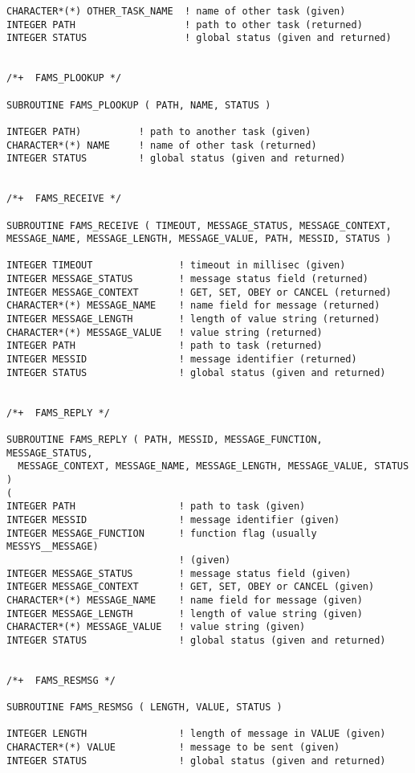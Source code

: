 \begin{verbatim}
CHARACTER*(*) OTHER_TASK_NAME  ! name of other task (given)
INTEGER PATH                   ! path to other task (returned)
INTEGER STATUS                 ! global status (given and returned)


/*+  FAMS_PLOOKUP */

SUBROUTINE FAMS_PLOOKUP ( PATH, NAME, STATUS )

INTEGER PATH)          ! path to another task (given)
CHARACTER*(*) NAME     ! name of other task (returned)
INTEGER STATUS         ! global status (given and returned)


/*+  FAMS_RECEIVE */

SUBROUTINE FAMS_RECEIVE ( TIMEOUT, MESSAGE_STATUS, MESSAGE_CONTEXT,
MESSAGE_NAME, MESSAGE_LENGTH, MESSAGE_VALUE, PATH, MESSID, STATUS )

INTEGER TIMEOUT               ! timeout in millisec (given)
INTEGER MESSAGE_STATUS        ! message status field (returned)
INTEGER MESSAGE_CONTEXT       ! GET, SET, OBEY or CANCEL (returned)
CHARACTER*(*) MESSAGE_NAME    ! name field for message (returned)
INTEGER MESSAGE_LENGTH        ! length of value string (returned)
CHARACTER*(*) MESSAGE_VALUE   ! value string (returned)
INTEGER PATH                  ! path to task (returned)
INTEGER MESSID                ! message identifier (returned)
INTEGER STATUS                ! global status (given and returned)


/*+  FAMS_REPLY */

SUBROUTINE FAMS_REPLY ( PATH, MESSID, MESSAGE_FUNCTION, MESSAGE_STATUS,
  MESSAGE_CONTEXT, MESSAGE_NAME, MESSAGE_LENGTH, MESSAGE_VALUE, STATUS )
(
INTEGER PATH                  ! path to task (given)
INTEGER MESSID                ! message identifier (given)
INTEGER MESSAGE_FUNCTION      ! function flag (usually MESSYS__MESSAGE)
                              ! (given)
INTEGER MESSAGE_STATUS        ! message status field (given)
INTEGER MESSAGE_CONTEXT       ! GET, SET, OBEY or CANCEL (given)
CHARACTER*(*) MESSAGE_NAME    ! name field for message (given)
INTEGER MESSAGE_LENGTH        ! length of value string (given)
CHARACTER*(*) MESSAGE_VALUE   ! value string (given)
INTEGER STATUS                ! global status (given and returned)


/*+  FAMS_RESMSG */

SUBROUTINE FAMS_RESMSG ( LENGTH, VALUE, STATUS )

INTEGER LENGTH                ! length of message in VALUE (given)
CHARACTER*(*) VALUE           ! message to be sent (given)
INTEGER STATUS                ! global status (given and returned)



\end{verbatim}
